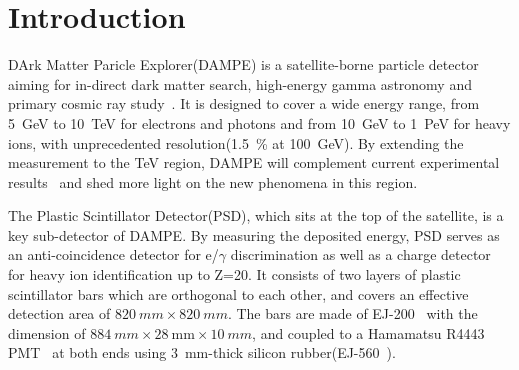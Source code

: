 \documentclass[5p, times]{elsarticle}
\begin{document}
\linenumbers
\section{Introduction}
\label{sec:introduction}

DArk Matter Paricle Explorer(DAMPE) is a satellite-borne particle detector aiming for in-direct dark matter search, high-energy gamma astronomy and primary cosmic ray study~\cite{Chang_Jin_dampe}.
It is designed to cover a wide energy range, from \SI{5}{GeV} to \SI{10}{TeV} for electrons and photons and from \SI{10}{GeV} to \SI{1}{PeV} for heavy ions, with unprecedented resolution(\SI{1.5}{\percent} at \SI{100}{\giga\electronvolt}).
By extending the measurement to the \si{TeV} region, DAMPE will complement current experimental results~\cite{guzik_advanced_1999,picozza2010instrument,aguilar2013first} and shed more light on the new phenomena in this region. 

The Plastic Scintillator Detector(PSD), which sits at the top of the satellite, is a key sub-detector of DAMPE.
By measuring the deposited energy, PSD serves as an anti-coincidence detector for e/$\gamma$ discrimination as well as a charge detector for heavy ion identification up to Z=20.
It consists of two layers of plastic scintillator bars which are orthogonal to each other, and covers an effective detection area of $\SI{820}{mm}\times\SI{820}{mm}$.
The bars are made of EJ-200~\cite{scintillator} with the dimension of $\SI{884}{mm} \times \SI{28}{\milli\meter} \times \SI{10}{mm}$, and coupled to a Hamamatsu R4443 PMT~\cite{r4443} at both ends using \SI{3}{mm}-thick silicon rubber(EJ-560~\cite{scintillator}).

\end{document}
